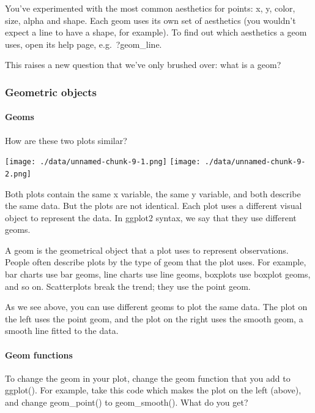 \documentclass[
]{article}
\begin{document}
You've experimented with the most common aesthetics for points: x, y,
color, size, alpha and shape. Each geom uses its own set of aesthetics
(you wouldn't expect a line to have a shape, for example). To find out
which aesthetics a geom uses, open its help page, e.g.~?geom\_line.

This raises a new question that we've only brushed over: what is a geom?

\hypertarget{geometric-objects}{%
\subsubsection{Geometric objects}\label{geometric-objects}}

\hypertarget{geoms}{%
\paragraph{Geoms}\label{geoms}}

How are these two plots similar?

\texttt{[image: ./data/unnamed-chunk-9-1.png]}
\texttt{[image: ./data/unnamed-chunk-9-2.png]}

Both plots contain the same x variable, the same y variable, and both
describe the same data. But the plots are not identical. Each plot uses
a different visual object to represent the data. In ggplot2 syntax, we
say that they use different geoms.

A geom is the geometrical object that a plot uses to represent
observations. People often describe plots by the type of geom that the
plot uses. For example, bar charts use bar geoms, line charts use line
geoms, boxplots use boxplot geoms, and so on. Scatterplots break the
trend; they use the point geom.

As we see above, you can use different geoms to plot the same data. The
plot on the left uses the point geom, and the plot on the right uses the
smooth geom, a smooth line fitted to the data.

\hypertarget{geom-functions}{%
\paragraph{Geom functions}\label{geom-functions}}

To change the geom in your plot, change the geom function that you add
to ggplot(). For example, take this code which makes the plot on the
left (above), and change geom\_point() to geom\_smooth(). What do you
get?
\end{document}
